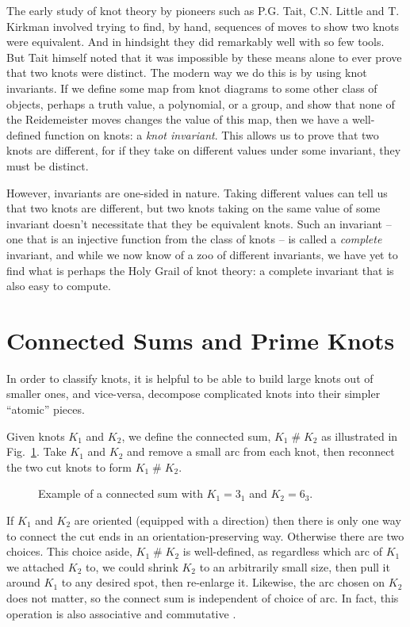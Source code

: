 \documentclass[12pt]{report}
\newcommand{\hash}{\ensuremath{\mathbin{\#}}}
\theoremstyle{upright}
\begin{document}
The early study of knot theory by pioneers such as P.G. Tait, C.N. Little and T. Kirkman involved trying to find, by hand, sequences of moves to show two knots were equivalent. And in hindsight they did remarkably well with so few tools. But Tait himself noted that it was impossible by these means alone to ever prove that two knots were distinct. The modern way we do this is by using knot invariants. If we define some map from knot diagrams to some other class of objects, perhaps a truth value, a polynomial, or a group, and show that none of the Reidemeister moves changes the value of this map, then we have a well-defined function on knots: a \textit{knot invariant}. This allows us to prove that two knots are different, for if they take on different values under some invariant, they must be distinct.

However, invariants are one-sided in nature. Taking different values can tell us that two knots are different, but two knots taking on the same value of some invariant doesn't necessitate that they be equivalent knots. Such an invariant -- one that is an injective function from the class of knots -- is called a \textit{complete} invariant, and while we now know of a zoo of different invariants, we have yet to find what is perhaps the Holy Grail of knot theory: a complete invariant that is also easy to compute.


\section{Connected Sums and Prime Knots}
In order to classify knots, it is helpful to be able to build large knots out of smaller ones, and vice-versa, decompose complicated knots into their simpler ``atomic'' pieces.

Given knots $K_{1}$ and $K_{2}$, we define the connected sum, $K_{1} \hash K_{2}$ as illustrated in Fig.~\ref{fig:connected-sum}. Take $K_{1}$ and $K_{2}$ and remove a small arc from each knot, then reconnect the two cut knots to form $K_{1} \hash K_{2}$.

\begin{figure}[hbt]
	\centering
	\def\svgscale{0.5}
	
	\caption{Example of a connected sum with $K_{1} = 3_{1}$ and $K_{2} = 6_{3}$.}
	\label{fig:connected-sum}
\end{figure}


If $K_{1}$ and $K_{2}$ are oriented (equipped with a direction) then there is only one way to connect the cut ends in an orientation-preserving way. Otherwise there are two choices. This choice aside, $K_{1} \hash K_{2}$ is well-defined, as regardless which arc of $K_{1}$ we attached $K_{2}$ to, we could shrink $K_{2}$ to an arbitrarily small size, then pull it around $K_{1}$ to any desired spot, then re-enlarge it. Likewise, the arc chosen on $K_{2}$ does not matter, so the connect sum is independent of choice of arc. In fact, this operation is also associative and commutative \cite[Corollary 7.13]{knots}.
\end{document}
